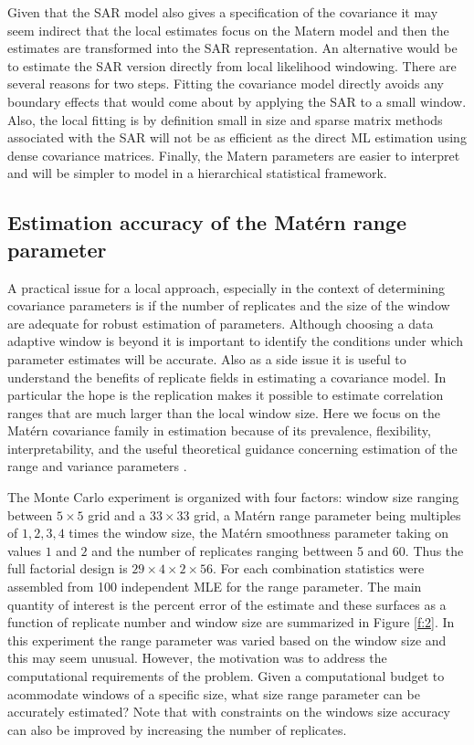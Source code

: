 \documentclass[review]{elsarticle}
\begin{document}
Given that the SAR model also gives a specification of the covariance it may seem indirect that the local estimates focus on the Matern model and then the estimates are transformed into the SAR representation. An alternative would be to estimate the SAR version directly from local likelihood windowing. There are several  reasons for two steps. Fitting the covariance model directly avoids any boundary effects that would come about by applying the SAR to a small window. Also, the local fitting is by definition small in size and sparse matrix methods associated with the SAR will not be as efficient as the direct ML estimation using dense covariance matrices.  Finally, the Matern parameters are easier to interpret and will be simpler to model  in a hierarchical statistical framework. 

\subsection{Estimation accuracy of the Mat\'ern range parameter}
\label{ss:2}
A practical issue for a local approach, especially in the context of determining covariance parameters  is if the number of replicates and the size of the window are adequate for robust estimation of  parameters. 
Although choosing a data adaptive window is beyond it is important to identify the conditions under which parameter estimates will be accurate.  Also as a side issue it is useful to understand the benefits of replicate fields in estimating a covariance model. In particular the hope is the replication makes it possible to estimate correlation ranges that are much larger than the local window size. 
Here we  focus on the Mat\'ern covariance family in estimation because of its prevalence, flexibility, interpretability,  and the useful theoretical guidance  concerning estimation of the range and variance parameters \cite{kaufman2013role}. 

The Monte Carlo experiment is organized with four factors: window size ranging between 
 $5 \times 5$ grid and a $33 \times 33$ grid, a Mat\'ern range parameter being multiples of $1,2,3,4$ times the window size, 
 the  Mat\'ern smoothness  parameter taking on values $1$ and $2$  and  the number of replicates ranging bettween 5 and 60.  Thus the full factorial design is $29 \times 4 \times 2 \times 56$. 
For each combination statistics were assembled from 100 independent MLE for the range parameter. 
 The  main quantity of interest is the percent error of the estimate and these surfaces as a function of replicate number and window size are summarized in Figure \ref{f:2}.  In this experiment the range parameter was varied based on the window size and this  may seem unusual.  However, the motivation was to address the computational requirements of the problem. Given a computational budget to acommodate windows of a specific size, what size range parameter can be accurately estimated? Note that with constraints on the windows size accuracy can also be improved by increasing the number of replicates. 
\end{document}
